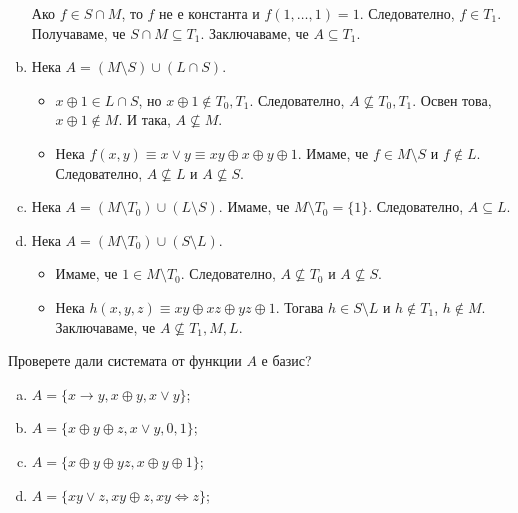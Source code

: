 \begin{solution}
\begin{enumerate}[a)]
    Ако $f \in S \cap M$, то $f$ не е константа и $f(1,\dots,1) = 1$.
    Следователно, $f \in T_1$.
    Получаваме, че $S \cap M \subseteq T_1$.
    Заключаваме, че $A \subseteq T_1$.
  \item
    Нека $A = (M\setminus S)\cup(L\cap S)$.
    \begin{itemize}
    \item 
      $x\oplus 1 \in L \cap S$, но $x \oplus 1 \not\in T_0, T_1$.
      Следователно, $A \not\subseteq T_0,T_1$.
      Освен това, $x\oplus 1 \not\in M$.
      И така, $A \not\subseteq M$.
    \item
      Нека $f(x,y) \equiv x \vee y \equiv xy \oplus x \oplus y \oplus 1$.
      Имаме, че $f \in M \setminus S$ и $f \not\in L$.
      Следователно, $A \not\subseteq L$ и $A \not\subseteq S$.
    \end{itemize}
  \item
    Нека $A = (M \setminus T_0) \cup (L \setminus S)$.
    Имаме, че $M \setminus T_0 = \{1\}$.
    Следователно, $A \subseteq L$.
  \item
    Нека $A = (M \setminus T_0) \cup (S \setminus L)$.
    \begin{itemize}
    \item 
      Имаме, че $1 \in M\setminus T_0$.
      Следователно, $A \not\subseteq T_0$ и $A \not\subseteq S$.
    \item
      Нека $h(x,y,z) \equiv xy \oplus xz \oplus yz \oplus 1$.
      Тогава $h \in S\setminus L$ и $h \not\in T_1$, $h \not \in M$.
      Заключаваме, че $A \not\subseteq T_1, M, L$.
    \end{itemize}
  \end{enumerate}
\end{solution}

\begin{problem} %
  Проверете дали системата от функции $A$ е базис?
  \begin{enumerate}[a)]
  \item
    $A = \{x\rightarrow y, x\oplus y, x\vee y\}$;
  \item
    $A = \{x\oplus y\oplus z, x\vee y, 0, 1\}$;
  \item
    $A = \{x\oplus y\oplus yz, x \oplus y \oplus 1\}$;
  \item
    $A = \{xy \vee z, xy \oplus z, xy \iff z\}$;
  \end{enumerate}
\end{problem}

